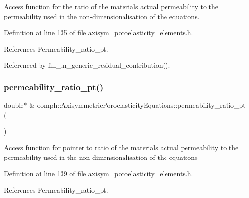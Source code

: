 Access function for the ratio of the material\textquotesingle{}s actual permeability to the permeability used in the non-\/dimensionalisation of the equations. 



Definition at line 135 of file axisym\+\_\+poroelasticity\+\_\+elements.\+h.



References Permeability\+\_\+ratio\+\_\+pt.



Referenced by fill\+\_\+in\+\_\+generic\+\_\+residual\+\_\+contribution().

\mbox{\label{classoomph_1_1AxisymmetricPoroelasticityEquations_a58aa8cf5415562e37884fc8a5304803f}} 
\subsubsection{\texorpdfstring{permeability\+\_\+ratio\+\_\+pt()}{permeability\_ratio\_pt()}}
{\footnotesize\ttfamily double$\ast$ \& oomph\+::\+Axisymmetric\+Poroelasticity\+Equations\+::permeability\+\_\+ratio\+\_\+pt (\begin{DoxyParamCaption}{ }\end{DoxyParamCaption})\hspace{0.3cm}{\ttfamily [inline]}}

Access function for pointer to ratio of the material\textquotesingle{}s actual permeability to the permeability used in the non-\/dimensionalisation of the equations 

Definition at line 139 of file axisym\+\_\+poroelasticity\+\_\+elements.\+h.



References Permeability\+\_\+ratio\+\_\+pt.

\mbox{\label{classoomph_1_1AxisymmetricPoroelasticityEquations_aa38488da8fec869f377a39c5c0da4311}} 
